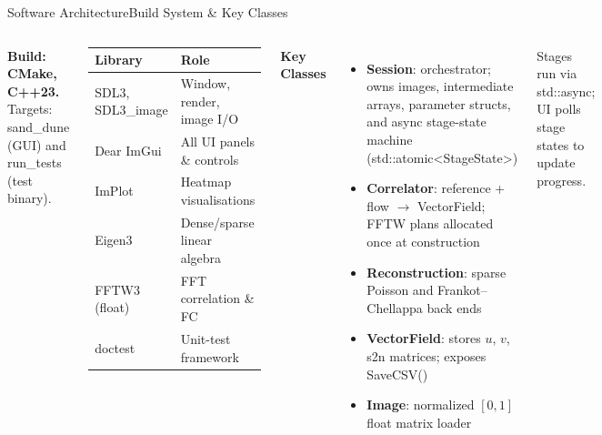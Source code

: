 \documentclass[9pt, aspectratio=169]{beamer}
\newcommand{\code}[1]{{\ttfamily\color{accent!85!black}#1}}
\newcommand{\theadrow}{\rowcolor{accentlight}}
\begin{document}
\begin{frame}{Software Architecture}{Build System \& Key Classes}
  \begin{columns}[t]
      \textbf{Build: CMake, C++23.}
      Targets: \code{sand\_dune} (GUI) and \code{run\_tests} (test binary).
      \vspace{0.3em}
      \begin{center}
        \small
        \begin{tabular}{ll}
          \toprule
          \theadrow Library & Role \\
          \midrule
          SDL3, SDL3\_image  & Window, render, image I/O \\
          Dear ImGui         & All UI panels \& controls \\
          ImPlot             & Heatmap visualisations \\
          Eigen3             & Dense/sparse linear algebra \\
          FFTW3 (float)      & FFT correlation \& FC \\
          doctest            & Unit-test framework \\
          \bottomrule
        \end{tabular}
      \end{center}
      \textbf{Key Classes}
      \begin{itemize}
        \item \textbf{\code{Session}}: orchestrator; owns images, intermediate arrays, parameter structs, and async stage-state machine (\code{std::atomic<StageState>})
        \item \textbf{\code{Correlator}}: reference + flow $\to$ \code{VectorField}; FFTW plans allocated once at construction
        \item \textbf{\code{Reconstruction}}: sparse Poisson and Frankot--Chellappa back ends
        \item \textbf{\code{VectorField}}: stores $u$, $v$, s2n matrices; exposes \code{SaveCSV()}
        \item \textbf{\code{Image}}: normalized $[0,1]$ float matrix loader
      \end{itemize}
      \small Stages run via \code{std::async}; UI polls stage states to update progress.
  \end{columns}
\end{frame}

\end{document}
